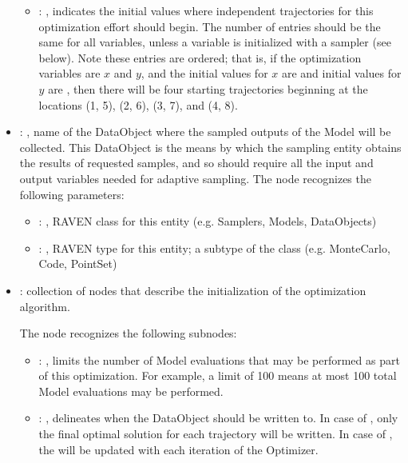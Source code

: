 \begin{itemize}
\begin{itemize}
        \item {}: , 
          indicates the initial values where independent trajectories for this optimization
          effort should begin. The number of entries should be the same for all variables, unless
          a variable is initialized with a sampler (see  below). Note these
          entries are ordered; that is, if the optimization variables are $x$ and $y$, and the
          initial               values for $x$ are  and initial values for $y$
          are ,               then there will be four starting trajectories
          beginning at the locations (1, 5), (2, 6),               (3, 7), and (4, 8).
      \end{itemize}

    \item {}: , 
      name of the DataObject where the sampled outputs of the Model will be collected.
      This DataObject is the means by which the sampling entity obtains the results of requested
      samples, and so should require all the input and output variables needed for adaptive
      sampling.
      The  node recognizes the following parameters:
        \begin{itemize}
          \item {}: , 
            RAVEN class for this entity (e.g. Samplers, Models, DataObjects)
          \item {}: , 
            RAVEN type for this entity; a subtype of the class (e.g. MonteCarlo, Code, PointSet)
      \end{itemize}

    \item {}:
      collection of nodes that describe the initialization of the optimization algorithm.

      The  node recognizes the following subnodes:
      \begin{itemize}
        \item {}: , 
          limits the number of Model evaluations that may be performed as part of this optimization.
          For example, a limit of 100 means at most 100 total Model evaluations may be performed.

        \item {}: , 
          delineates when the  DataObject should be written to. In case
          of , only the final optimal solution for each trajectory will be written.
          In case of , the  will be updated with each
          iteration               of the Optimizer.


\end{itemize}
\end{itemize}

